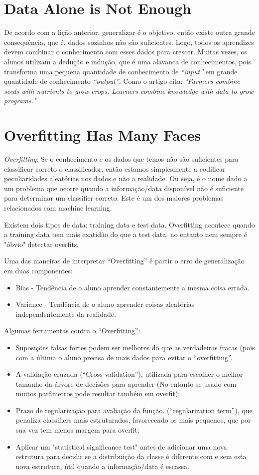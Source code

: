 \documentclass{article}
\begin{document}
\section{Data Alone is Not Enough}
De acordo com a lição anterior, generalizar é o objetivo, então existe outra grande consequência, que é, dados sozinhos não são suficientes. Logo, todos os aprendizes devem combinar o conhecimento com esses dados para crescer.
Muitas vezes, os alunos utilizam a dedução e indução, que é uma alavanca de conhecimentos, pois transforma uma pequena quantidade de conhecimento de \emph{“input”} em grande quantidade de conhecimento \emph{“output”}. Como o artigo cita: \emph{"Farmers combine seeds with nutrients to grow crops. Learners combine knowledge with data to grow programs."}

\section{Overfitting Has Many Faces}
\emph{Overfitting}: Se o conhecimento e os dados que temos não são suficientes para classificar correto o classificador, então estamos simplesmente a codificar peculiaridades aleatórias nos dados e não a realidade. Ou seja, é o nome dado a um problema que ocorre quando a informação/data disponível não é suficiente para determinar um classifier correto.
Este é um dos maiores problemas relacionados com machine learning.

Existem dois tipos de data: training data e test data.
Overfitting acontece quando a training data tem mais exatidão do que a test data, no entanto nem sempre é "óbvio" detectar overfits.

Uma das maneiras de interpretar “Overfitting” é partir o erro de generalização em duas componentes:
\begin{itemize}
    \item  Bias - Tendência de o aluno aprender constantemente a mesma coisa errada.
    \item  Variance - Tendência de o aluno aprender coisas aleatórias independentemente da realidade.
\end{itemize}

Algumas ferramentas contra o “Overfitting”:
\begin{itemize}
    \item Suposições falsas fortes podem ser melhores do que as verdadeiras fracas (pois com a última o aluno precisa de mais dados para evitar o “overfitting”.
    \item A validação cruzada (“Cross-validation”), utilizada para escolher o melhor tamanho da árvore de decisões para aprender (No entanto se usado com muitos parâmetros pode resultar também em overfit);
    \item Prazo de regularização para avaliação da função. (“regularization term”), que penaliza classifiers mais estruturados, favorecendo os mais pequenos, que por sua vez tem menos margem para overfit; 
    \item Aplicar um "statistical significance test" antes de adicionar uma nova estrutura para decidir se a distribuição da classe é diferente com e sem esta nova estrutura, útil quando a informação/data é escassa.
\end{itemize}
 
\end{document}

